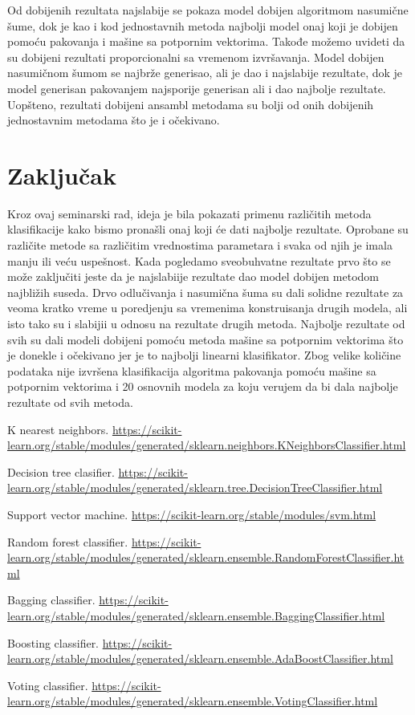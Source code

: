 \documentclass[a4paper]{article}
\begin{document}
Od dobijenih rezultata najslabije se pokaza model dobijen algoritmom nasumične šume, dok je kao i kod jednostavnih metoda najbolji model onaj koji je dobijen pomoću pakovanja i mašine sa potpornim vektorima. Takođe možemo uvideti da su dobijeni rezultati proporcionalni sa vremenom izvršavanja. Model dobijen nasumičnom šumom se najbrže generisao, ali je dao i najslabije rezultate, dok je model generisan pakovanjem najsporije generisan ali i dao najbolje rezultate. Uopšteno, rezultati dobijeni ansambl metodama su bolji od onih dobijenih jednostavnim metodama što je i očekivano.




\section{Zaključak}
Kroz ovaj seminarski rad, ideja je bila pokazati primenu različitih metoda klasifikacije kako bismo pronašli onaj koji će dati najbolje rezultate. Oprobane su različite metode sa različitim vrednostima parametara i svaka od njih je imala manju ili veću uspešnost.
Kada pogledamo sveobuhvatne rezultate prvo što se može zaključiti jeste da je najslabiije rezultate dao model dobijen metodom najbližih suseda. Drvo odlučivanja i nasumična šuma su dali solidne rezultate za veoma kratko vreme u poredjenju sa vremenima konstruisanja drugih modela, ali isto tako su i slabijii u odnosu na rezultate drugih metoda. Najbolje rezultate od svih su dali modeli dobijeni pomoću metoda mašine sa potpornim vektorima što je donekle i očekivano jer je to najbolji linearni klasifikator. Zbog velike količine podataka nije izvršena klasifikacija algoritma pakovanja pomoću mašine sa potpornim vektorima i 20 osnovnih modela za koju verujem da bi dala najbolje rezultate od svih metoda.

\pagebreak

\begin{thebibliography}{9}
K nearest neighbors.
\url{https://scikit-learn.org/stable/modules/generated/sklearn.neighbors.KNeighborsClassifier.html}
 
Decision tree clasifier. 
\url{https://scikit-learn.org/stable/modules/generated/sklearn.tree.DecisionTreeClassifier.html}
 
Support vector machine.
\url{https://scikit-learn.org/stable/modules/svm.html}
 
Random forest classifier.
\url{https://scikit-learn.org/stable/modules/generated/sklearn.ensemble.RandomForestClassifier.html}

Bagging classifier.
\url{https://scikit-learn.org/stable/modules/generated/sklearn.ensemble.BaggingClassifier.html}

Boosting classifier.
\url{https://scikit-learn.org/stable/modules/generated/sklearn.ensemble.AdaBoostClassifier.html}

Voting classifier.
\url{https://scikit-learn.org/stable/modules/generated/sklearn.ensemble.VotingClassifier.html}


\end{thebibliography}
\appendix
\end{document}
